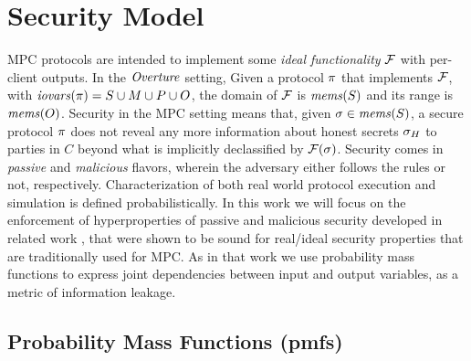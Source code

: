 \section{Security Model}
\label{section-model}

MPC protocols are intended to implement some \emph{ideal
functionality} $\mathcal{F}$ with per-client outputs. In the $\mathit{Overture}$
setting, Given a protocol $\pi$ that implements $\mathcal{F}$, with
$\mathit{iovars}(\pi) = S \cup M \cup P \cup O$, the domain of $\mathcal{F}$ is
$\mathit{mems}(S)$ and its range is $\mathit{mems}(O)$. Security in the MPC setting
means that, given $\sigma \in \mathit{mems}(S)$, a secure protocol $\pi$
does not reveal any more information about honest secrets $\sigma_H$
to parties in $C$ beyond what is implicitly declassified by
$\mathcal{F}(\sigma)$. Security comes in \emph{passive} and
\emph{malicious} flavors, wherein the adversary either follows the
rules or not, respectively. Characterization of both real world
protocol execution and simulation is defined probabilistically.  In
this work we will focus on the enforcement of hyperproperties of
passive and malicious security developed in related work
\cite{skalka-near-ppdp24}, that were shown to be sound for real/ideal
security properties that are traditionally used for MPC.  As in that
work we use probability mass functions to express joint dependencies
between input and output variables, as a metric of information
leakage.

\subsection{Probability Mass Functions (pmfs)} 

